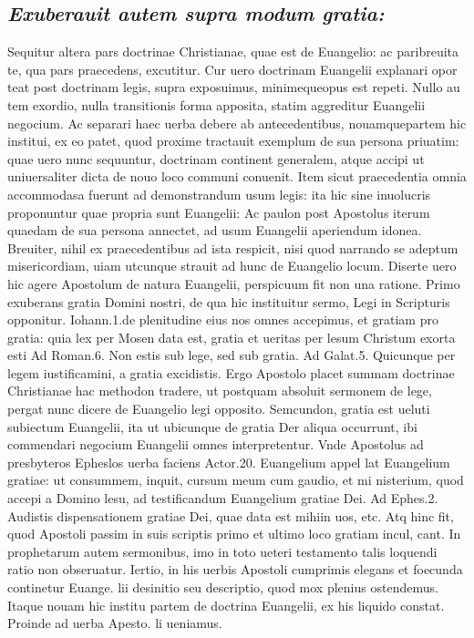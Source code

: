 \documentclass{article}
\begin{document}
\begin{pages}
\subsection*{\textit{Exuberauit autem supra modum gratia: }}\pstart Sequitur altera pars doctrinae Christianae, quae est de Euangelio: ac paribreuita te, qua pars praecedens, excutitur. Cur uero doctrinam Euangelii explanari opor teat post doctrinam legis, supra exposuimus, minimequeopus est repeti. Nullo au tem exordio, nulla transitionis forma apposita, statim aggreditur Euangelii negocium. Ac separari haec uerba debere ab antecedentibus, nouamquepartem hic institui, ex eo patet, quod proxime tractauit exemplum de sua persona priuatim: quae uero nunc sequuntur, doctrinam continent generalem, atque accipi ut uniuersaliter dicta de nouo loco communi conuenit. Item sicut praecedentia omnia accommodasa fuerunt ad demonstrandum usum legis: ita hic sine inuolucris proponuntur quae propria sunt Euangelii: Ac paulon post Apostolus iterum quaedam de sua persona annectet, ad usum Euangelii aperiendum idonea. Breuiter, nihil ex praecedentibus ad ista respicit, nisi quod narrando se adeptum misericordiam, uiam utcunque  strauit ad hunc de Euangelio locum. Diserte uero hic agere Apostolum de natura Euangelii, perspicuum fit non una ratione.  \pend\pstart Primo exuberans gratia Domini nostri, de qua hic instituitur sermo, Legi in Scripturis opponitur. Iohann.1.de plenitudine eius nos omnes accepimus, et gratiam pro gratia: quia lex per Mosen data est, gratia et ueritas per lesum Christum exorta esti Ad Roman.6. Non estis sub lege, sed sub gratia. Ad Galat.5. Quicunque per legem iustificamini, a gratia excidistis. Ergo Apostolo placet summam doctrinae Christianae hac methodon tradere, ut postquam absoluit sermonem de lege, pergat nunc dicere de Euangelio legi opposito.  \pend\pstart Semcundon, gratia est ueluti subiectum Euangelii, ita ut ubicunque de gratia Der aliqua occurrunt, ibi commendari negocium Euangelii omnes interpretentur. Vnde Apostolus ad presbyteros Epheslos uerba faciens Actor.20. Euangelium appel lat Euangelium gratiae: ut consummem, inquit, cursum meum cum gaudio, et mi nisterium, quod accepi a Domino lesu, ad testificandum Euangelium gratiae Dei. Ad Ephes.2. Audistis dispensationem gratiae Dei, quae data est mihiin uos, etc. Atq hinc fit, quod Apostoli passim in suis scriptis primo et ultimo loco gratiam incul, cant. In prophetarum autem sermonibus, imo in toto ueteri testamento talis loquendi ratio non obseruatur.  \pend\pstart Iertio, in his uerbis Apostoli cumprimis elegans et foecunda continetur Euange. lii desinitio seu descriptio, quod mox plenius ostendemus. Itaque nouam hic institu partem de doctrina Euangelii, ex his liquido constat. Proinde ad uerba Apesto. li ueniamus.  \pend
{}
{}

\end{pages}
\end{document}
